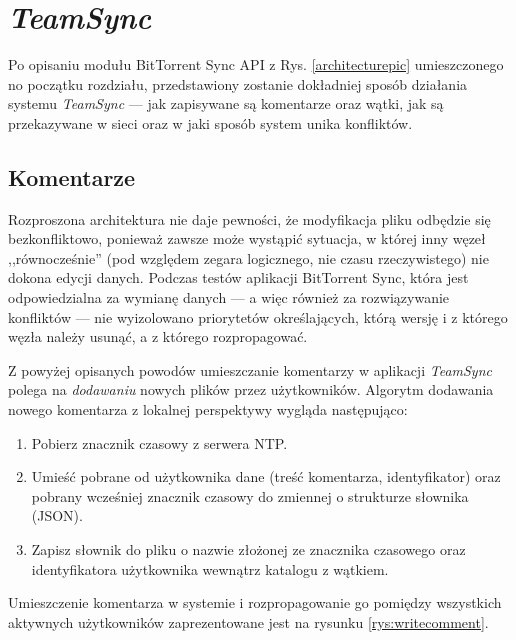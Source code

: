 \documentclass[polish,a4paper,twoside]{ppfcmthesis}
\begin{document}
\section{\emph{TeamSync}}

\label{teamsyncarch}

Po opisaniu modułu BitTorrent Sync API z Rys. \ref{architecturepic} umieszczonego no początku rozdziału, przedstawiony zostanie dokładniej sposób działania systemu \emph{TeamSync} --- jak zapisywane są komentarze oraz wątki, jak są przekazywane w sieci oraz w jaki sposób system unika konfliktów.

\subsection{Komentarze}

\label{archcomments}

Rozproszona architektura nie daje pewności, że modyfikacja pliku odbędzie się bezkonfliktowo, ponieważ zawsze może wystąpić sytuacja, w której inny węzeł ,,równocześnie'' (pod względem zegara logicznego, nie czasu rzeczywistego) nie dokona edycji danych. Podczas testów aplikacji BitTorrent Sync, która jest odpowiedzialna za wymianę danych --- a więc również za rozwiązywanie konfliktów --- nie wyizolowano priorytetów określających, którą wersję i z którego węzła należy usunąć, a z którego rozpropagować.
 
Z powyżej opisanych powodów umieszczanie komentarzy w aplikacji \emph{TeamSync} polega na \emph{dodawaniu} nowych plików przez użytkowników. Algorytm dodawania nowego komentarza z lokalnej perspektywy wygląda następująco:

\begin{enumerate}[noitemsep]
 \item Pobierz znacznik czasowy z serwera NTP.
 
 \item Umieść pobrane od użytkownika dane (treść komentarza, identyfikator) oraz pobrany wcześniej znacznik czasowy do zmiennej o strukturze słownika (JSON).
 
 \item Zapisz słownik do pliku o nazwie złożonej ze znacznika czasowego oraz identyfikatora użytkownika wewnątrz katalogu z wątkiem.
\end{enumerate}

Umieszczenie komentarza w systemie i rozpropagowanie go pomiędzy wszystkich aktywnych użytkowników zaprezentowane jest na rysunku \ref{rys:writecomment}.
\end{document}
